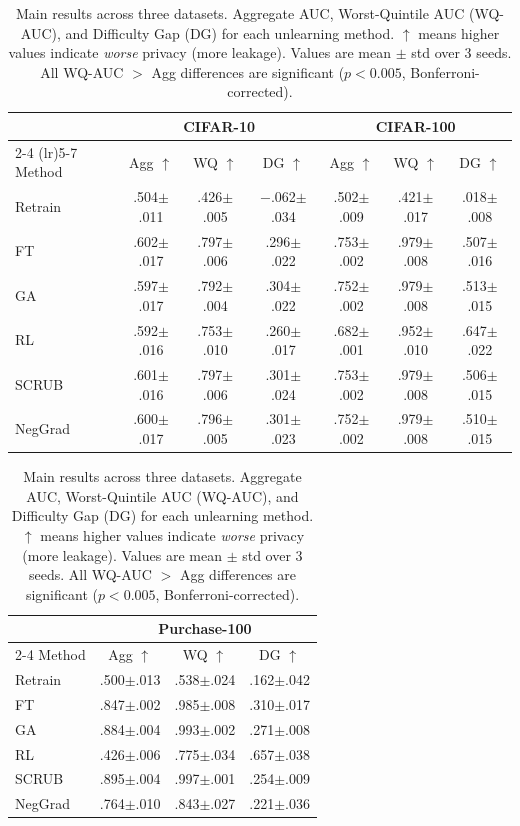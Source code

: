 \documentclass{article}
\begin{document}
\begin{table}[t]
\caption{Main results across three datasets. Aggregate AUC, Worst-Quintile AUC (WQ-AUC), and Difficulty Gap (DG) for each unlearning method. $\uparrow$ means higher values indicate \emph{worse} privacy (more leakage). Values are mean $\pm$ std over 3 seeds. All WQ-AUC $>$ Agg differences are significant ($p < 0.005$, Bonferroni-corrected).}
\label{tab:main}
\centering
\small
\begin{tabular}{l ccc ccc}
\toprule
& \multicolumn{3}{c}{\textbf{CIFAR-10}} & \multicolumn{3}{c}{\textbf{CIFAR-100}} \\
\cmidrule(lr){2-4} \cmidrule(lr){5-7}
Method & Agg $\uparrow$ & WQ $\uparrow$ & DG $\uparrow$ & Agg $\uparrow$ & WQ $\uparrow$ & DG $\uparrow$ \\
\midrule
Retrain  & .504$\pm$.011 & .426$\pm$.005 & $-$.062$\pm$.034 & .502$\pm$.009 & .421$\pm$.017 & .018$\pm$.008 \\
\midrule
FT       & .602$\pm$.017 & .797$\pm$.006 & .296$\pm$.022 & .753$\pm$.002 & .979$\pm$.008 & .507$\pm$.016 \\
GA       & .597$\pm$.017 & .792$\pm$.004 & .304$\pm$.022 & .752$\pm$.002 & .979$\pm$.008 & .513$\pm$.015 \\
RL       & .592$\pm$.016 & .753$\pm$.010 & .260$\pm$.017 & .682$\pm$.001 & .952$\pm$.010 & .647$\pm$.022 \\
SCRUB    & .601$\pm$.016 & .797$\pm$.006 & .301$\pm$.024 & .753$\pm$.002 & .979$\pm$.008 & .506$\pm$.015 \\
NegGrad  & .600$\pm$.017 & .796$\pm$.005 & .301$\pm$.023 & .752$\pm$.002 & .979$\pm$.008 & .510$\pm$.015 \\
\bottomrule
\end{tabular}
\vspace{6pt}

\begin{tabular}{l ccc}
\toprule
& \multicolumn{3}{c}{\textbf{Purchase-100}} \\
\cmidrule(lr){2-4}
Method & Agg $\uparrow$ & WQ $\uparrow$ & DG $\uparrow$ \\
\midrule
Retrain  & .500$\pm$.013 & .538$\pm$.024 & .162$\pm$.042 \\
\midrule
FT       & .847$\pm$.002 & .985$\pm$.008 & .310$\pm$.017 \\
GA       & .884$\pm$.004 & .993$\pm$.002 & .271$\pm$.008 \\
RL       & .426$\pm$.006 & .775$\pm$.034 & .657$\pm$.038 \\
SCRUB    & .895$\pm$.004 & .997$\pm$.001 & .254$\pm$.009 \\
NegGrad  & .764$\pm$.010 & .843$\pm$.027 & .221$\pm$.036 \\
\bottomrule
\end{tabular}
\end{table}
\end{document}
